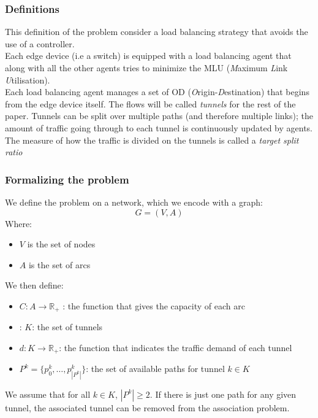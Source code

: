 \documentclass{article}
\begin{document}
\subsubsection{Definitions}

This definition of the problem consider a load balancing strategy that avoids the use of a controller. \\

Each edge device (i.e a switch) is equipped with a load balancing agent that along with all the other agents tries to minimize the MLU (\textit{M}aximum \textit{L}ink \textit{U}tilisation). \\
Each load balancing agent manages a set of OD (\textit{O}rigin-\textit{D}estination) that begins from the edge device itself.
The flows will be called \textit{tunnels} for the rest of the paper.
Tunnels can be split over multiple paths (and therefore multiple links); the amount of traffic going through to each tunnel is continuously updated by agents.
The measure of how the traffic is divided on the tunnels is called a \textit{target split ratio}

\subsubsection{Formalizing the problem}

We define the problem on a network, which we encode with a graph:
\[
	G = (V,A)
\]
Where:
\begin{itemize}
	\item $V$ is the set of nodes
	\item $A$ is the set of arcs	
\end{itemize}

We then define:
\begin{itemize}
	\item $C: A \rightarrow \mathbb{R}_+  $ : the function that gives the capacity of each arc
	\item: $K$: the set of tunnels
	\item $d: K \rightarrow \mathbb{R}_+$: the function that indicates the traffic demand of each tunnel
	\item $P^k = \{ p^k_0, \dots, p^k_{|P^k|}\}$: the set of available paths for tunnel $k \in K$
\end{itemize}
We assume that for all $k \in K$, $|P^k| \ge 2$. If there is just one path for any given tunnel, the associated tunnel can be removed from the association problem.
\end{document}
